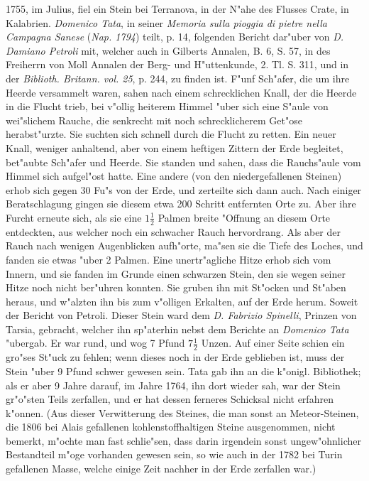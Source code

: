 \documentclass[a4paper, 11pt, oneside, polutonikogreek, german]{article}
\begin{document}
1755, im Julius, fiel ein Stein bei Terranova, in der N"ahe des Flusses Crate, in Kalabrien. \emph{Domenico Tata}, in seiner \emph{Memoria sulla pioggia di pietre nella Campagna Sanese} (\emph{Nap. 1794}) teilt, p. 14, folgenden Bericht dar"uber von \emph{D. Damiano Petroli} mit, welcher auch in Gilberts Annalen, B. 6, S. 57, in des Freiherrn von Moll Annalen der Berg- und H"uttenkunde, 2. Tl. S. 311, und in der \emph{Biblioth. Britann. vol. 25}, p. 244, zu finden ist. F"unf Sch"afer, die um ihre Heerde versammelt waren, sahen nach einem schrecklichen Knall, der die Heerde in die Flucht trieb, bei v"ollig heiterem Himmel "uber sich eine S"aule von wei"slichem Rauche, die senkrecht mit noch schrecklicherem Get"ose herabst"urzte. Sie suchten sich schnell durch die Flucht zu retten. Ein neuer Knall, weniger anhaltend, aber von einem heftigen Zittern der Erde begleitet, bet"aubte Sch"afer und Heerde. Sie standen und sahen, dass die Rauchs"aule vom Himmel sich aufgel"ost hatte. Eine andere (von den niedergefallenen Steinen) erhob sich gegen 30 Fu"s von der Erde, und zerteilte sich dann auch. Nach einiger Beratschlagung gingen sie diesem etwa 200 Schritt entfernten Orte zu. Aber ihre Furcht erneute sich, als sie eine $\mathfrak{1\frac{1}{2}}$ Palmen breite "Offnung an diesem Orte entdeckten, aus welcher noch ein schwacher Rauch hervordrang. Als aber der Rauch nach wenigen Augenblicken aufh"orte, ma"sen sie die Tiefe des Loches, und fanden sie etwas "uber 2 Palmen. Eine unertr"agliche Hitze erhob sich vom Innern, und sie fanden im Grunde einen schwarzen Stein, den sie wegen seiner Hitze noch nicht ber"uhren konnten. Sie gruben ihn mit St"ocken und St"aben heraus, und w"alzten ihn bis zum v"olligen Erkalten, auf der Erde herum. Soweit der Bericht von Petroli. Dieser Stein ward dem \emph{D. Fabrizio Spinelli}, Prinzen von Tarsia, gebracht, welcher ihn sp"aterhin nebst dem Berichte an \emph{Domenico Tata} "ubergab. Er war rund, und wog 7 Pfund $\mathfrak{7\frac{1}{2}}$ Unzen. Auf einer Seite schien ein gro"ses St"uck zu fehlen; wenn dieses noch in der Erde geblieben ist, muss der Stein "uber 9 Pfund schwer gewesen sein. Tata gab ihn an die k"onigl. Bibliothek; als er aber 9 Jahre darauf, im Jahre 1764, ihn dort wieder sah, war der Stein gr"o"sten Teils zerfallen, und er hat dessen ferneres Schicksal nicht erfahren k"onnen. (Aus dieser Verwitterung des Steines, die man sonst an Meteor-Steinen, die 1806 bei Alais gefallenen kohlenstoffhaltigen Steine ausgenommen, nicht bemerkt, m"ochte man fast schlie"sen, dass darin irgendein sonst ungew"ohnlicher Bestandteil m"oge vorhanden gewesen sein, so wie auch in der 1782 bei Turin gefallenen Masse, welche einige Zeit nachher in der Erde zerfallen war.)
\end{document}
